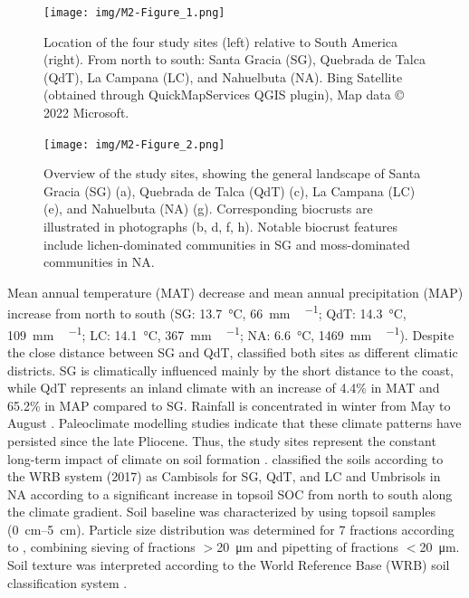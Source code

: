 \begin{figure}[H]
	\centering
	\texttt{[image: img/M2-Figure\_1.png]}
	\caption[Location of the four study sites relative to South America]{Location of the four study sites (left) relative to South America (right). From north to south: Santa Gracia (SG), Quebrada de Talca (QdT), La Campana (LC), and Nahuelbuta (NA). Bing Satellite (obtained through QuickMapServices QGIS plugin), Map data $©$2022 Microsoft.}
	\label{fig:M2-F1}
\end{figure}

\FloatBarrier

\begin{figure}[H]
	\centering
	\texttt{[image: img/M2-Figure\_2.png]}
	\caption[Overviw of the study sites and sampled biocrusts]{Overview of the study sites, showing the general landscape of Santa Gracia (SG) (a), Quebrada de Talca (QdT) (c), La Campana (LC) (e), and Nahuelbuta (NA) (g). Corresponding biocrusts are illustrated in photographs (b, d, f, h). Notable biocrust features include lichen-dominated communities in SG and moss-dominated communities in NA.}
	\label{fig:M2-F2}
\end{figure}

\FloatBarrier

Mean annual temperature (MAT) decrease and mean annual precipitation (MAP) increase from north to south (SG: \SI{13.7}{\degreeCelsius}, \SI{66}{\milli\metre\,\year^{-1}}; QdT: \SI{14.3}{\degreeCelsius}, \SI{109}{\milli\metre\,\year^{-1}}; LC: \SI{14.1}{\degreeCelsius}, \SI{367}{\milli\metre\,\year^{-1}}; NA: \SI{6.6}{\degreeCelsius}, \SI{1469}{\milli\metre\,\year^{-1}}). Despite the close distance between SG and QdT, \citet{Santibnez2017} classified both sites as different climatic districts. SG is climatically influenced mainly by the short distance to the coast, while QdT represents an inland climate with an increase of 4.4\% in MAT and 65.2\% in MAP compared to SG. Rainfall is concentrated in winter from May to August \citep{Bernhard2018,Canessa2020}. Paleoclimate modelling studies \citep{Mutz2018} indicate that these climate patterns have persisted since the late Pliocene. Thus, the study sites represent the constant long-term impact of climate on soil formation \citep{Ewing2006}. \citet{Bernhard2018} classified the soils according to the WRB system (2017) as Cambisols for SG, QdT, and LC and Umbrisols in NA according to a significant increase in topsoil SOC from north to south along the climate gradient. Soil baseline was characterized by \citet{RiverasMunoz2022} using topsoil samples (\SIrange[range-phrase=--,range-units=single]{0}{5}{\centi\meter}). Particle size distribution was determined for 7 fractions according to \citet{Kohn1929}, combining sieving of fractions $>$\SI{20}{\micro\meter} and pipetting of fractions $<$\SI{20}{\micro\meter}. Soil texture was interpreted according to the World Reference Base (WRB) soil classification system \citep{Jahn2006}.

